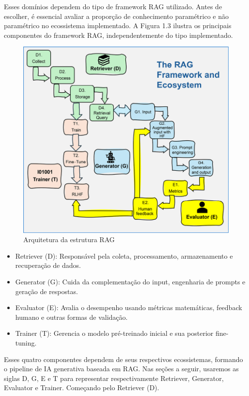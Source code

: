 \documentclass[a4paper, 12pt]{article}
\begin{document}
    Esses domínios dependem do tipo de framework RAG utilizado. Antes de escolher, é essencial avaliar a proporção de conhecimento paramétrico e não paramétrico no ecossistema implementado. A Figura 1.3 ilustra os principais componentes do framework RAG, independentemente do tipo implementado.

    \begin{figure}[h]
        \includegraphics{rag-framework-ecosystem.png}
        \centering
        \caption{Arquitetura da estrutura RAG}
        \centering
    \end{figure}

    \begin{itemize}
        \item Retriever (D): Responsável pela coleta, processamento, armazenamento e recuperação de dados.
        \item Generator (G): Cuida da complementação do input, engenharia de prompts e geração de respostas.
        \item Evaluator (E): Avalia o desempenho usando métricas matemáticas, feedback humano e outras formas de validação.
        \item Trainer (T): Gerencia o modelo pré-treinado inicial e sua posterior fine-tuning.
    \end{itemize}

    Esses quatro componentes dependem de seus respectivos ecossistemas, formando o pipeline de IA generativa baseada em RAG. Nas seções a seguir, usaremos as siglas D, G, E e T para representar respectivamente Retriever, Generator, Evaluator e Trainer. Começando pelo Retriever (D).
\end{document}
